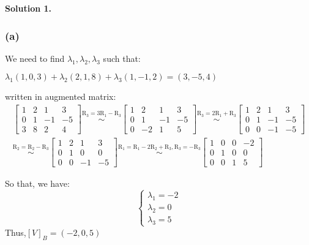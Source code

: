 \documentclass[12pt]{article}
\newcommand{\solution}[1]{\noindent \textbf{Solution #1.}}
\begin{document}
\solution{1}

\subsubsection*{(a)}

  We need to find $\lambda_1, \lambda_2, \lambda_3$ such that:
  \begin{center}
    $\lambda_1(1,0,3)+\lambda_2(2,1,8)+\lambda_3(1,-1,2)=(3,-5,4)$
  \end{center}
  written in augmented matrix:
  \[
  \begin{aligned}
  \left[\begin{array}{ccc|c}
  1 & 2 & 1 & 3 \\
  0 & 1 & -1 & -5 \\ 
  3 & 8 & 2 & 4
  \end{array}\right]
  \overset{\text{R}_3 = 3\text{R}_1 - \text{R}_3}{\sim}
  \left[\begin{array}{ccc|c}
  1 & 2 & 1 & 3 \\
  0 & 1 & -1 & -5 \\
  0 & -2 & 1 & 5
  \end{array}\right]
  \overset{\text{R}_3 = 2\text{R}_1 + \text{R}_3}{\sim}
  \left[\begin{array}{ccc|c}
  1 & 2 & 1 & 3 \\
  0 & 1 & -1 & -5 \\
  0 & 0 & -1 & -5
  \end{array}\right]
  \\\overset{\text{R}_2 = \text{R}_2 -\text{R}_3}{\sim}
  \left[\begin{array}{ccc|c}
  1 & 2 & 1 & 3 \\
  0 & 1 & 0 & 0 \\
  0 & 0 & -1 & -5
  \end{array}\right]
  \overset{\text{R}_1 = \text{R}_1 - 2\text{R}_2 + \text{R}_3, \text{R}_3 = -\text{R}_3}{\sim}
  \left[\begin{array}{ccc|c}
  1 & 0 & 0 & -2 \\
  0 & 1 & 0 & 0 \\
  0 & 0 & 1 & 5
  \end{array}\right]
  \end{aligned}
  \]


  So that, we have:
  $$
  \left\{\begin{array}{l}
  \lambda_1=-2 \\
  \lambda_2=0 \\
  \lambda_3=5
  \end{array}\right.
  $$
  Thus,$[V]_B = (-2,0,5)$
\end{document}
